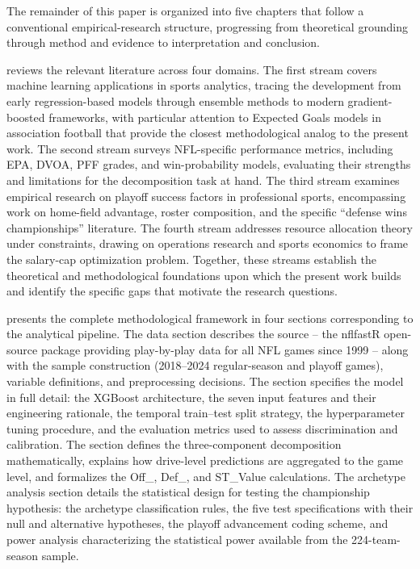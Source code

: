 The remainder of this paper is organized into five chapters that follow a conventional empirical-research structure, progressing from theoretical grounding through method and evidence to interpretation and conclusion.

 reviews the relevant literature across four domains. The first stream covers machine learning applications in sports analytics, tracing the development from early regression-based models through ensemble methods to modern gradient-boosted frameworks, with particular attention to Expected Goals models in association football that provide the closest methodological analog to the present work. The second stream surveys NFL-specific performance metrics, including EPA, DVOA, PFF grades, and win-probability models, evaluating their strengths and limitations for the decomposition task at hand. The third stream examines empirical research on playoff success factors in professional sports, encompassing work on home-field advantage, roster composition, and the specific ``defense wins championships'' literature. The fourth stream addresses resource allocation theory under constraints, drawing on operations research and sports economics to frame the salary-cap optimization problem. Together, these streams establish the theoretical and methodological foundations upon which the present work builds and identify the specific gaps that motivate the research questions.

 presents the complete methodological framework in four sections corresponding to the analytical pipeline. The data section describes the source  -- the nflfastR open-source package providing play-by-play data for all NFL games since 1999  -- along with the sample construction (2018--2024 regular-season and playoff games), variable definitions, and preprocessing decisions. The \xscore{} section specifies the model in full detail: the XGBoost architecture, the seven input features and their engineering rationale, the temporal train--test split strategy, the hyperparameter tuning procedure, and the evaluation metrics used to assess discrimination and calibration. The \gds{} section defines the three-component decomposition mathematically, explains how drive-level \xscore{} predictions are aggregated to the game level, and formalizes the Off\_\xvoa{}, Def\_\xvoa{}, and ST\_Value calculations. The archetype analysis section details the statistical design for testing the championship hypothesis: the archetype classification rules, the five test specifications with their null and alternative hypotheses, the playoff advancement coding scheme, and power analysis characterizing the statistical power available from the 224-team-season sample.

